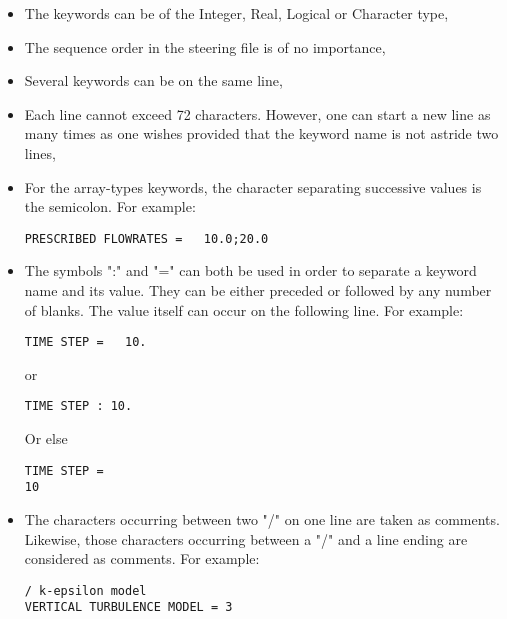 \begin{itemize}
\item The keywords can be of the Integer, Real, Logical or Character type,

\item The sequence order in the steering file is of no importance,

\item Several keywords can be on the same line,

\item Each line cannot exceed 72 characters. However, one can start a new line
as many times as one wishes provided that the keyword name is not astride two
lines,

\item For the array-types keywords, the character separating successive values
is the semicolon. For example:

\begin{lstlisting}[language=TelemacCas]
PRESCRIBED FLOWRATES =   10.0;20.0
\end{lstlisting}

\item The symbols ":" and "=" can both be used in order to separate a keyword
name and its value. They can be either preceded or followed by any number of
blanks. The value itself can occur on the following line. For example:

\begin{lstlisting}[language=TelemacCas]
TIME STEP =   10.
\end{lstlisting}

or

\begin{lstlisting}[language=TelemacCas]
TIME STEP : 10.
\end{lstlisting}

Or else

\begin{lstlisting}[language=TelemacCas]
TIME STEP =
10
\end{lstlisting}

\item The characters occurring between two "/" on one line are taken as
comments. Likewise, those characters occurring between a "/" and a line ending
are considered as comments. For example:

\begin{lstlisting}[language=TelemacCas]
/ k-epsilon model
VERTICAL TURBULENCE MODEL = 3
\end{lstlisting}


\end{itemize}
